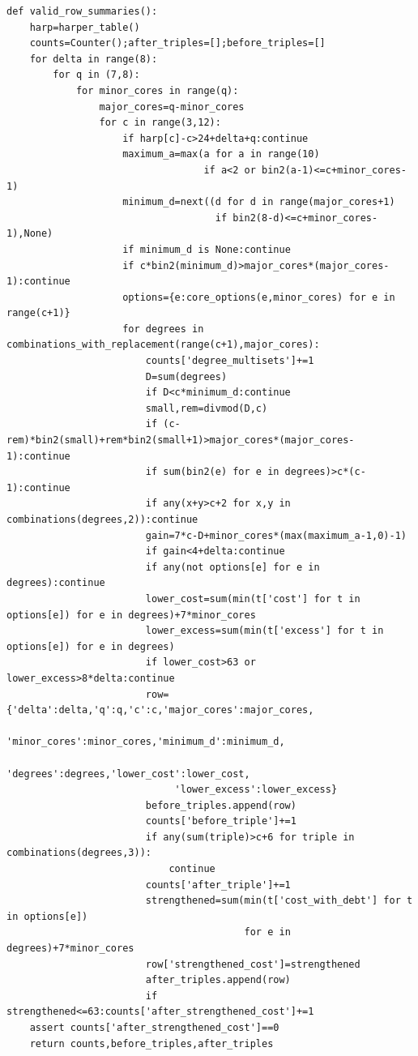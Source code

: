 \documentclass[11pt,a4paper]{article}
\begin{document}
\begin{Verbatim}[breaklines,breakanywhere,fontsize=\footnotesize]
def valid_row_summaries():
    harp=harper_table()
    counts=Counter();after_triples=[];before_triples=[]
    for delta in range(8):
        for q in (7,8):
            for minor_cores in range(q):
                major_cores=q-minor_cores
                for c in range(3,12):
                    if harp[c]-c>24+delta+q:continue
                    maximum_a=max(a for a in range(10)
                                  if a<2 or bin2(a-1)<=c+minor_cores-1)
                    minimum_d=next((d for d in range(major_cores+1)
                                    if bin2(8-d)<=c+minor_cores-1),None)
                    if minimum_d is None:continue
                    if c*bin2(minimum_d)>major_cores*(major_cores-1):continue
                    options={e:core_options(e,minor_cores) for e in range(c+1)}
                    for degrees in combinations_with_replacement(range(c+1),major_cores):
                        counts['degree_multisets']+=1
                        D=sum(degrees)
                        if D<c*minimum_d:continue
                        small,rem=divmod(D,c)
                        if (c-rem)*bin2(small)+rem*bin2(small+1)>major_cores*(major_cores-1):continue
                        if sum(bin2(e) for e in degrees)>c*(c-1):continue
                        if any(x+y>c+2 for x,y in combinations(degrees,2)):continue
                        gain=7*c-D+minor_cores*(max(maximum_a-1,0)-1)
                        if gain<4+delta:continue
                        if any(not options[e] for e in degrees):continue
                        lower_cost=sum(min(t['cost'] for t in options[e]) for e in degrees)+7*minor_cores
                        lower_excess=sum(min(t['excess'] for t in options[e]) for e in degrees)
                        if lower_cost>63 or lower_excess>8*delta:continue
                        row={'delta':delta,'q':q,'c':c,'major_cores':major_cores,
                             'minor_cores':minor_cores,'minimum_d':minimum_d,
                             'degrees':degrees,'lower_cost':lower_cost,
                             'lower_excess':lower_excess}
                        before_triples.append(row)
                        counts['before_triple']+=1
                        if any(sum(triple)>c+6 for triple in combinations(degrees,3)):
                            continue
                        counts['after_triple']+=1
                        strengthened=sum(min(t['cost_with_debt'] for t in options[e])
                                         for e in degrees)+7*minor_cores
                        row['strengthened_cost']=strengthened
                        after_triples.append(row)
                        if strengthened<=63:counts['after_strengthened_cost']+=1
    assert counts['after_strengthened_cost']==0
    return counts,before_triples,after_triples



\end{Verbatim}
\end{document}
